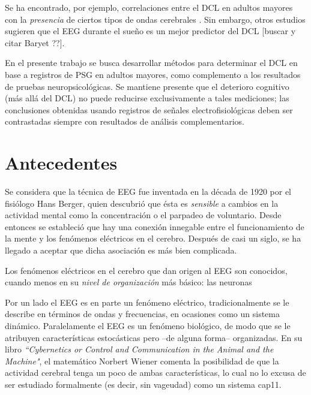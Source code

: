 Se ha encontrado, por ejemplo, correlaciones entre el DCL en adultos mayores con la \textit{presencia} de ciertos tipos de ondas cerebrales \cite{babiloni13,prichep94,prichep06}.
%
Sin embargo, otros estudios sugieren que el EEG durante el sueño es un mejor predictor del DCL [buscar y citar Baryet ??].

En el presente trabajo se busca desarrollar métodos para determinar el DCL en base a registros de PSG en adultos mayores, como complemento a los resultados de pruebas neuropsicológicas.
%
Se mantiene presente que el deterioro cognitivo (más allá del DCL) no puede reducirse exclusivamente a tales mediciones; las conclusiones obtenidas usando registros de señales electrofisiológicas deben ser contrastadas siempre con resultados de análisis complementarios.


\section*{Antecedentes}

Se considera que la técnica de EEG fue inventada en la década de 1920 por el fisiólogo Hans Berger, quien descubrió que ésta es \textit{sensible} a cambios en la actividad mental como la concentración o el parpadeo de voluntario.
%
Desde entonces se estableció que hay una conexión innegable entre el funcionamiento de la mente y los fenómenos eléctricos en el cerebro.
%
Después de casi un siglo, se ha llegado a aceptar que dicha asociación es más bien complicada.

Los fenómenos eléctricos en el cerebro que dan origen al EEG son conocidos, cuando menos en su \textit{nivel de organización} más básico: las neuronas
%


Por un lado el EEG es en parte un fenómeno eléctrico, tradicionalmente se le describe en términos de ondas y frecuencias, en ocasiones como un sistema dinámico.
%
Paralelamente el EEG es un fenómeno biológico, de modo que se le atribuyen características estocásticas pero --de alguna forma-- organizadas.
%
En su libro \textit{``Cybernetics or Control and Communication in the Animal and the Machine"}, el matemático Norbert Wiener comenta la posibilidad de que la actividad cerebral tenga un poco de ambas características, lo cual no lo excusa de ser estudiado formalmente (es decir, sin vageudad) como un sistema \cite{wiener61} cap11.

